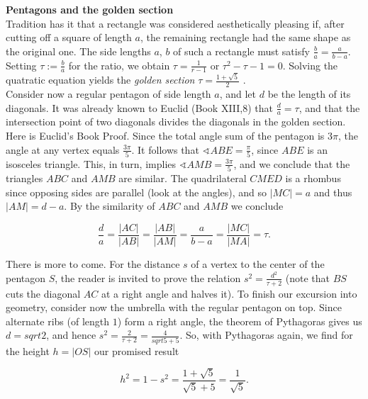\documentclass[12pt]{memoir}
\begin{document}
\begin{mdframed}[nobreak=true]
\vspace{8pt}
{\Large\textbf{Pentagons and the golden section}}\\
[5pt]
Tradition has it that a rectangle was considered aesthetically pleasing 
if, after cutting off a square of length $a$, the remaining rectangle had 
the same shape as the original one. The side lengths $a$, $b$  of such a
rectangle must satisfy $\frac{b}{a}= \frac{a}{b-a}$. Setting $\tau := \frac{b}{a}$
for the ratio, we obtain $\tau = \frac{1}{r-1}$ or $\tau^2 - \tau - 1 = 0$. Solving
the quatratic equation yields the \textit{golden section} $\tau = \frac{1 + \sqrt{5}}{2}$ .\\

Consider now a regular pentagon of side length $a$, and let $d$ be the 
length of its diagonals. It was already known to Euclid (Book XIII,8) 
that $\frac{d}{a} = \tau$, and that the intersection point of two diagonals divides 
the diagonals in the golden section.\\

Here is Euclid's Book Proof. Since the total angle sum of the pentagon 
is $3\pi$, the angle at any vertex equals $\frac{3\pi}{5}$. It follows that 
$\sphericalangle ABE = \frac{\pi}{5}$, since $ABE$ is an isosceles triangle. This, in turn, 
implies $\sphericalangle AMB = \frac{3\pi}{5}$, and we conclude that the triangles $ABC$ and 
$AMB$ are similar. The quadrilateral $CMED$  is a rhombus since opposing sides are
parallel (look at the angles), and so $|MC| = a$ and thus $|AM| = d - a$. By the similarity of 
$ABC$ and $AMB$ we conclude

\begin{equation*}
  \frac{d}{a} = \frac{|AC|}{|AB|} = \frac{|AB|}{|AM|} = \frac{a}{b-a} = \frac{|MC|}{|MA|} = \tau.
\end{equation*}

There is more to come. For the distance $s$ of a vertex to the center of 
the pentagon $S$,  the reader is invited to prove the relation $s^2 = \frac{d^2}{\tau + 2}$ 
(note that $BS$ cuts the diagonal $AC$ at a right angle and halves it). 
To finish our excursion into geometry, consider now the umbrella 
with the regular pentagon on top. Since alternate ribs (of length $1$) 
form a right angle, the theorem of Pythagoras gives us $d = sqrt{2}$, and 
hence $s^2 = \frac{2}{\tau + 2} = \frac{4}{sqrt{5} + 5}$. So, with Pythagoras again, 
we find for the height $h = |OS|$ our promised result

\begin{equation*}
  h^2 = 1 - s^2 = \frac{1+\sqrt{5}}{\sqrt{5}+5} = \frac{1}{\sqrt{5}}.
\end{equation*}

\vspace{5pt}

\end{mdframed}
\end{document}
